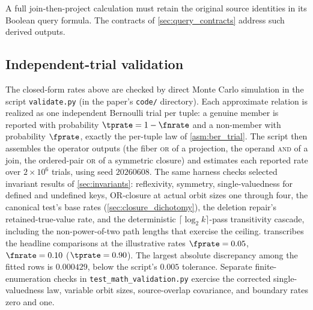 \documentclass[ ../main.tex]{subfiles}
\begin{document}
A full join-then-project calculation must retain the original source identities
in its Boolean query formula. The contracts of \cref{sec:query_contracts}
address such derived outputs.

\subsection{Independent-trial validation}
\label{sec:rel_validation}
The closed-form rates above are checked by direct Monte Carlo simulation in the
script \texttt{validate.py} (in the paper's \texttt{code/} directory). Each
approximate relation is realized as one independent Bernoulli trial per tuple: a
genuine member is reported with probability $\tprate = 1 - \fnrate$ and a
non-member with probability $\fprate$, exactly the per-tuple law of
\cref{asm:ber_trial}. The script then assembles the operator outputs (the fiber
\textsc{or} of a projection, the operand \textsc{and} of a join, the ordered-pair
\textsc{or} of a symmetric closure) and estimates each reported rate over
$2\times 10^{6}$ trials, using seed $20260608$. The same harness checks
selected invariant results of \cref{sec:invariants}: reflexivity, symmetry,
single-valuedness for defined and undefined keys, OR-closure at actual orbit
sizes one through four, the canonical test's base rates
(\cref{sec:closure_dichotomy}), the deletion repair's retained-true-value
rate, and the deterministic
$\lceil \log_2 k \rceil$-pass transitivity cascade, including the non-power-of-two
path lengths that exercise the ceiling.  transcribes the headline
comparisons at the illustrative rates $\fprate = 0.05$, $\fnrate = 0.10$
($\tprate = 0.90$). The largest absolute discrepancy among the fitted rows is
$0.000429$, below the script's $0.005$ tolerance. Separate finite-enumeration
checks in \texttt{test\_math\_validation.py} exercise the corrected
single-valuedness law, variable orbit sizes, source-overlap covariance, and
boundary rates zero and one.
\end{document}
